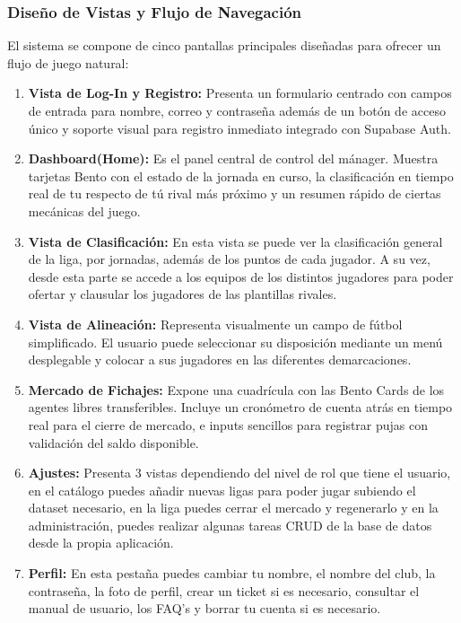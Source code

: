 \subsubsection{Diseño de Vistas y Flujo de Navegación}
El sistema se compone de cinco pantallas principales diseñadas para ofrecer un flujo de juego natural:
\begin{enumerate}
    \item \textbf{Vista de Log-In y Registro:} Presenta un formulario centrado con campos de entrada para nombre, correo y contraseña además de un botón de acceso único y soporte visual para registro inmediato integrado con Supabase Auth.
    \item \textbf{Dashboard(Home):} Es el panel central de control del mánager. Muestra tarjetas Bento con el estado de la jornada en curso, la clasificación en tiempo real de tu respecto de tú rival más próximo y un resumen rápido de ciertas mecánicas del juego.
    \item \textbf{Vista de Clasificación:} En esta vista se puede ver la clasificación general de la liga, por jornadas, además de los puntos de cada jugador. A su vez, desde esta parte se accede a los equipos de los distintos jugadores para poder ofertar y clausular los jugadores de las plantillas rivales.
    \item \textbf{Vista de Alineación:} Representa visualmente un campo de fútbol simplificado. El usuario puede seleccionar su disposición mediante un menú desplegable y colocar a sus jugadores en las diferentes demarcaciones.
    \item \textbf{Mercado de Fichajes:} Expone una cuadrícula con las Bento Cards de los agentes libres transferibles. Incluye un cronómetro de cuenta atrás en tiempo real para el cierre de mercado, e inputs sencillos para registrar pujas con validación del saldo disponible.
    \item \textbf{Ajustes:} Presenta 3 vistas dependiendo del nivel de rol que tiene el usuario, en el catálogo puedes añadir nuevas ligas para poder jugar subiendo el dataset necesario, en la liga puedes cerrar el mercado y regenerarlo y en la administración, puedes realizar algunas tareas CRUD de la base de datos desde la propia aplicación.
    \item \textbf{Perfil:} En esta pestaña puedes cambiar tu nombre, el nombre del club, la contraseña, la foto de perfil, crear un ticket si es necesario, consultar el manual de usuario, los FAQ's y borrar tu cuenta si es necesario.
\end{enumerate}

